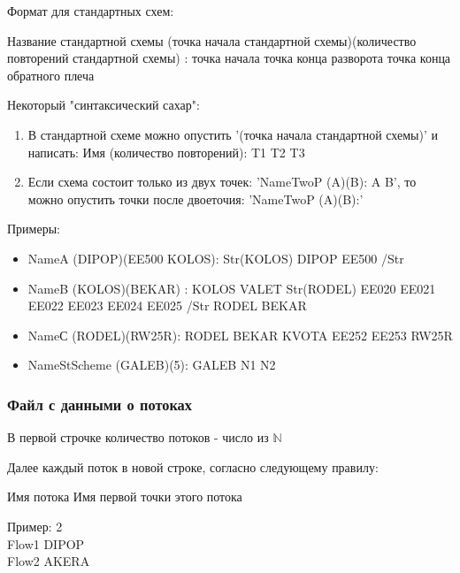 \documentclass[12pt, a4 paper]{article}
\theoremstyle{plain}
\begin{document}
\bigskip

Формат для стандартных схем:

\bigskip

\begin{center}
Название стандартной схемы (точка начала стандартной схемы)(количество повторений стандартной схемы) : точка начала точка конца разворота точка конца обратного плеча
\end{center}

\bigskip

Некоторый "синтаксический сахар":

\begin{enumerate}
	\item В стандартной схеме можно опустить '(точка начала стандартной схемы)' и написать: Имя (количество повторений): T1 T2 T3
	\item Если схема состоит только из двух точек: 'NameTwoP (A)(B): A B', то можно опустить точки после двоеточия: 'NameTwoP (A)(B):'
\end{enumerate}

Примеры:
\begin{itemize}
	\item NameA (DIPOP)(EE500 KOLOS): Str(KOLOS) DIPOP EE500 /Str
	\item NameB (KOLOS)(BEKAR) : KOLOS VALET Str(RODEL) EE020 EE021 EE022 EE023 EE024 EE025 /Str RODEL BEKAR
	\item NameС (RODEL)(RW25R): RODEL BEKAR KVOTA EE252 EE253 RW25R
	\item NameStScheme (GALEB)(5): GALEB N1 N2
\end{itemize}


\subsubsection*{Файл с данными о потоках}

В первой строчке количество потоков - число из $\mathbb{N}$

Далее каждый  поток в новой строке, согласно следующему правилу:

\begin{center}
Имя потока  Имя первой точки этого потока
\end{center}

Пример:
2\\
Flow1 DIPOP\\
Flow2 AKERA
\end{document}
